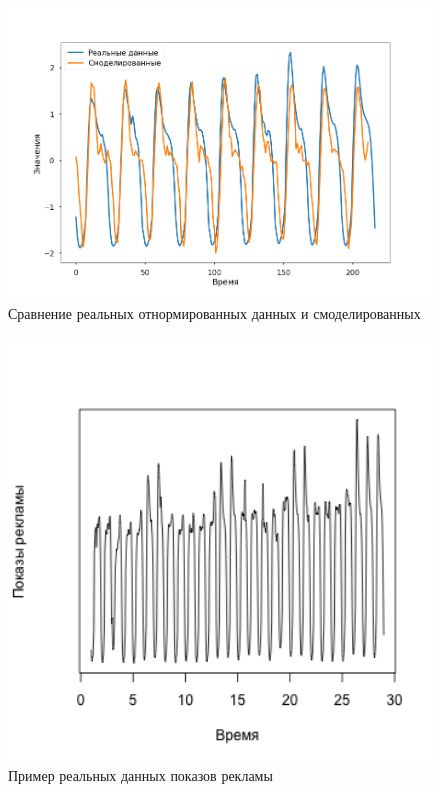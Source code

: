 \documentclass[%
12pt,
master,  %
natbib,      %
subf,        %
substylefile = spbu.rtx,
href,        %
colorlinks,  %
]{disser}
\begin{document}
\begin{figure}[!hhh]
	\begin{center}
		\includegraphics[width=12cm]{examples_real_vs_modeling}
	\end{center}
	\vspace{-5mm}\caption{Сравнение реальных отнормированных данных и смоделированных}
	\label{fig:examples_real_vs_modeling}
\end{figure}


\begin{figure}[!hhh]
	\begin{center}
		\includegraphics[width=12cm]{examples_long_ts}
	\end{center}
	\vspace{-5mm}\caption{Пример реальных данных показов рекламы}
	\label{fig:examples_long_ts}
\end{figure}
\end{document}
